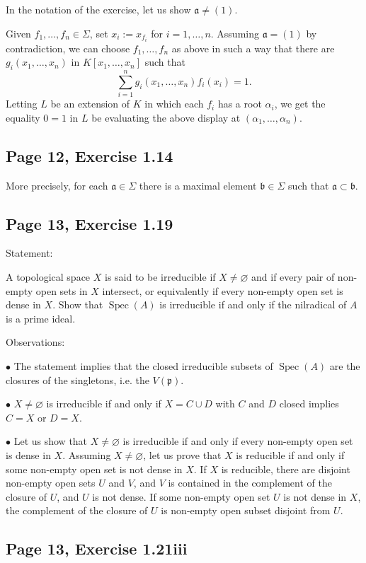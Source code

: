 \documentclass[parskip=half,fontsize=12pt]{scrartcl}%
\newcommand{\mf}{\mathfrak}
\newcommand{\aaa}{\mf a}
\newcommand{\ppp}{\mf p}
\newcommand{\bu}{\bullet}
\newcommand{\Spec}{\operatorname{Spec}}\newcommand{\Sp}{\operatorname{Spec}}
\begin{document}
In the notation of the exercise, let us show $\aaa\neq(1)$. 

Given $f_1,\dots,f_n\in\Sigma$, set $x_i:=x_{f_i}$ for $i=1,\dots,n$. Assuming $\aaa=(1)$ by contradiction, we can choose $f_1,\dots,f_n$ as above in such a way that there are $g_i(x_1,\dots,x_n)$ in $K[x_1,\dots,x_n]$ such that 
$$
\sum_{i=1}^n g_i(x_1,\dots,x_n)f_i(x_i)=1.
$$ 
Letting $L$ be an extension of $K$ in which each $f_i$ has a root $\alpha_i$, we get the equality $0=1$ in $L$ be evaluating the above display at $(\alpha_1,\dots,\alpha_n)$.

\subsection{Page 12, Exercise 1.14}\label{114}%

More precisely, for each $\mf a\in\Sigma$ there is a maximal element $\mf b\in\Sigma$ such that $\mf a\subset\mf b$.

\subsection{Page 13, Exercise 1.19}\label{irr}%

Statement:

A topological space $X$ is said to be irreducible if $X\ne\varnothing$ and if every pair of non-empty open sets in $X$ intersect, or equivalently if every non-empty open set is dense in $X$. Show that $\Spec(A)$ is irreducible if and only if the nilradical of $A$ is a prime ideal.

Observations:

$\bu$ The statement implies that the closed irreducible subsets of $\Spec(A)$ are the closures of the singletons, i.e. the $V(\ppp)$. 

$\bu$ $X\ne\varnothing$ is irreducible if and only if $X=C\cup D$ with $C$ and $D$ closed implies $C=X$ or $D=X$. 

$\bu$ Let us show that $X\ne\varnothing$ is irreducible if and only if every non-empty open set is dense in $X$. Assuming $X\ne\varnothing$, let us prove that $X$ is reducible if and only if some non-empty open set is not dense in $X$. If $X$ is reducible, there are disjoint non-empty open sets $U$ and $V$, and $V$ is contained in the complement of the closure of $U$, and $U$ is not dense. If some non-empty open set $U$ is not dense in $X$, the complement of the closure of $U$ is non-empty open subset disjoint from $U$. 

\subsection{Page 13, Exercise 1.21iii}\label{121iii}%
\end{document}
